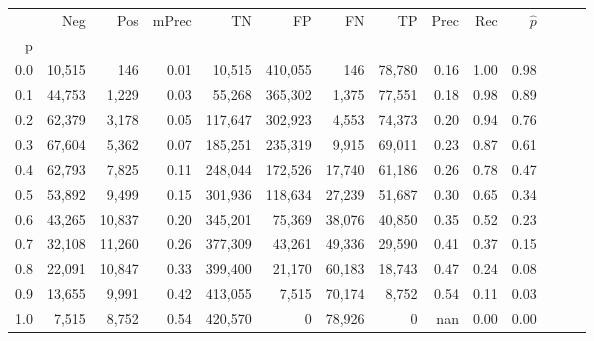 \begin{tabular}{rrrrrrrrrrrrrr}
\toprule
{} &     Neg &     Pos & mPrec &       TN &       FP &      FN &      TP &  Prec &   Rec & $\hat{p}$ \\
p   &         &         &       &          &          &         &         &       &       &           \\
\midrule
0.0 &  10,515 &     146 &  0.01 &   10,515 &  410,055 &     146 &  78,780 &  0.16 &  1.00 &      0.98 \\
0.1 &  44,753 &   1,229 &  0.03 &   55,268 &  365,302 &   1,375 &  77,551 &  0.18 &  0.98 &      0.89 \\
0.2 &  62,379 &   3,178 &  0.05 &  117,647 &  302,923 &   4,553 &  74,373 &  0.20 &  0.94 &      0.76 \\
0.3 &  67,604 &   5,362 &  0.07 &  185,251 &  235,319 &   9,915 &  69,011 &  0.23 &  0.87 &      0.61 \\
0.4 &  62,793 &   7,825 &  0.11 &  248,044 &  172,526 &  17,740 &  61,186 &  0.26 &  0.78 &      0.47 \\
0.5 &  53,892 &   9,499 &  0.15 &  301,936 &  118,634 &  27,239 &  51,687 &  0.30 &  0.65 &      0.34 \\
0.6 &  43,265 &  10,837 &  0.20 &  345,201 &   75,369 &  38,076 &  40,850 &  0.35 &  0.52 &      0.23 \\
0.7 &  32,108 &  11,260 &  0.26 &  377,309 &   43,261 &  49,336 &  29,590 &  0.41 &  0.37 &      0.15 \\
0.8 &  22,091 &  10,847 &  0.33 &  399,400 &   21,170 &  60,183 &  18,743 &  0.47 &  0.24 &      0.08 \\
0.9 &  13,655 &   9,991 &  0.42 &  413,055 &    7,515 &  70,174 &   8,752 &  0.54 &  0.11 &      0.03 \\
1.0 &   7,515 &   8,752 &  0.54 &  420,570 &        0 &  78,926 &       0 &   nan &  0.00 &      0.00 \\
\bottomrule
\end{tabular}
